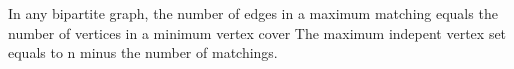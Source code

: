 In any bipartite graph, the number of edges in a maximum matching equals
the number of vertices in a minimum vertex cover
The maximum indepent vertex set equals to n minus the number of matchings.
